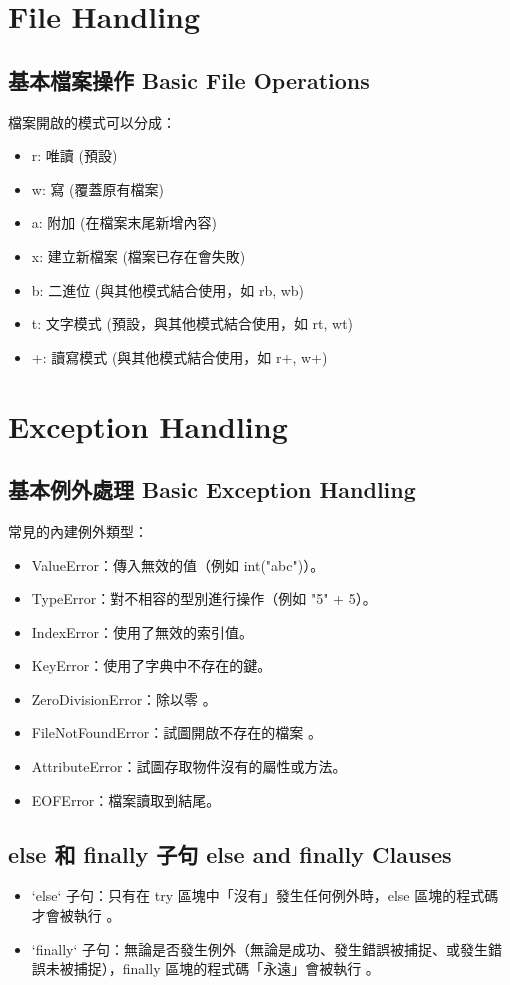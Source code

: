 \documentclass[a4paper,10pt,twocolumn,oneside]{article}
\begin{document}
\section{File Handling}
\subsection{基本檔案操作 Basic File Operations}
檔案開啟的模式可以分成：
\begin{itemize}
    \item r: 唯讀 (預設)
    \item w: 寫 (覆蓋原有檔案)
    \item a: 附加 (在檔案末尾新增內容)
    \item x: 建立新檔案 (檔案已存在會失敗)
    \item b: 二進位 (與其他模式結合使用，如 rb, wb)
    \item t: 文字模式 (預設，與其他模式結合使用，如 rt, wt)
    \item +: 讀寫模式 (與其他模式結合使用，如 r+, w+)
\end{itemize}


\section{Exception Handling}
\subsection{基本例外處理 Basic Exception Handling}
常見的內建例外類型：
\begin{itemize}
    \item ValueError：傳入無效的值（例如 int("abc")）。
    \item TypeError：對不相容的型別進行操作（例如 "5" + 5）。
    \item IndexError：使用了無效的索引值。
    \item KeyError：使用了字典中不存在的鍵。
    \item ZeroDivisionError：除以零 。
    \item FileNotFoundError：試圖開啟不存在的檔案 。
    \item AttributeError：試圖存取物件沒有的屬性或方法。
    \item EOFError：檔案讀取到結尾。
\end{itemize}

\subsection{else 和 finally 子句 else and finally Clauses}
\begin{itemize}
    \item `else` 子句：只有在 try 區塊中「沒有」發生任何例外時，else 區塊的程式碼才會被執行 。
    \item `finally` 子句：無論是否發生例外（無論是成功、發生錯誤被捕捉、或發生錯誤未被捕捉），finally 區塊的程式碼「永遠」會被執行 。
\end{itemize}

\end{document}
